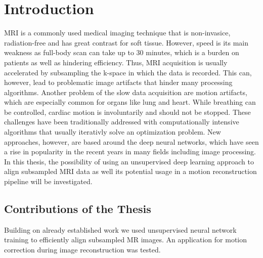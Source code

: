 \documentclass[english,version-2022-01]{uzl-thesis} %
\begin{document}

\chapter{Introduction} \label{Ch:Introduction}
MRI is a commonly used medical imaging technique that is non-invasice, radiation-free and has great contrast for soft tissue. However, speed is its main weakness as full-body scan can take up to 30 minutes, which is a burden on patients as well as hindering efficiency. Thus, MRI acquisition is usually accelerated by subsampling the k-space in which the data is recorded. This can, however, lead to problematic image artifacts that hinder many processing algorithms. Another problem of the slow data acquisition are motion artifacts, which are especially common for organs like lung and heart. While breathing can be controlled, cardiac motion is involuntarily and should not be stopped. These challenges have been traditionally addressed with computationally intensive algorithms that usually iterativly solve an optimization problem. New approaches, however, are based around the deep neural networks, which have seen a rise in popularity in the recent years in many fields including image processing. In this thesis, the possibility of using an unsupervised deep learning approach to align subsampled MRI data as well its potential usage in a motion reconstruction pipeline will be investigated.

\section{Contributions of the Thesis} \label{Sec:Contributions}
Building on already established work we used unsupervised neural network training to efficiently align subsampled MR images. An application for motion correction during image reconstruction was tested.
\end{document}
